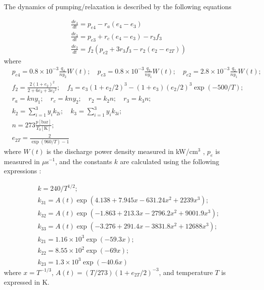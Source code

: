\documentclass{report}
\begin{document}
The dynamics of pumping/relaxation is described by the following equations

\begin{equation}\label{eq:dedt}
\begin{aligned}
&\frac{d e_4}{dt} = p_{e4} - r_a (e_4 - e_3)\\
&\frac{d e_3}{dt} = p_{e3} + r_c(e_4 - e_3) - r_3 f_3\\
&\frac{d e_2}{dt} = f_2 \left( p_{e2} + 3 r_3 f_3 - r_2 (e_2 - e_{2T}) \right)
\end{aligned}
\end{equation}
where
\begin{equation}\label{eq:dedt_rates}
\begin{aligned}
&p_{e4} = 0.8\times 10^{-3} \frac{q_4}{n y_2} W(t);\quad p_{e3} = 0.8\times 10^{-3}\frac{q_3}{n y_1} W(t);\quad p_{e2} = 2.8\times 10^{-3}\frac{q_2}{n y_1} W(t);\\
&f_2 = \frac{2(1+e_2)^2}{2+6e_2+3{e_2}^2};\quad f_3 = e_3(1+e_2/2)^3 - (1+e_3)(e_2/2)^3 \exp(- 500/T);\\
&r_a = kny_1;\quad r_c = kny_2;\quad r_2 = k_2n;\quad r_3 = k_3n;\\
&k_2 = \sum\limits_{i=1}^3 y_i k_{2i};\quad k_3 = \sum\limits_{i=1}^3 y_i k_{3i};\\
&n = 273 \frac{p[\text{bar}]}{T_0[\text{K}]};\\
&e_{2T} = \frac{2}{\exp(960/T)-1}
\end{aligned}
\end{equation}
where $W(t)$ is the discharge power density measured in {kW/cm$^3$} , $p_e$ is measured in {$\mu$s$^{-1}$}, and the constants $k$ are calculated using the following expressions \cite{Biryukov-1974,Taylor-1969}:

\begin{equation}
\begin{aligned}
&k = 240 / T^{1/2};\\
&k_{31} = A(t)\exp(4.138 + 7.945x - 631.24x^2 + 2239x^3);\\
&k_{32} = A(t)\exp(-1.863 + 213.3x - 2796.2x^2 + 9001.9x^3);\\
&k_{33} = A(t)\exp(-3.276 + 291.4x - 3831.8x^2 + 12688x^3);\\
&k_{21} = 1.16 \times 10^3 \exp(-59.3x);\\
&k_{22} = 8.55 \times 10^2 \exp(-69x);\\
&k_{23} = 1.3 \times 10^3 \exp(-40.6x)
\end{aligned}
\end{equation}
where $x=T^{-1/3}$, $A(t)=(T/273)(1+e_{2T}/2)^{-3}$, and temperature $T$ is expressed in K.
\end{document}
